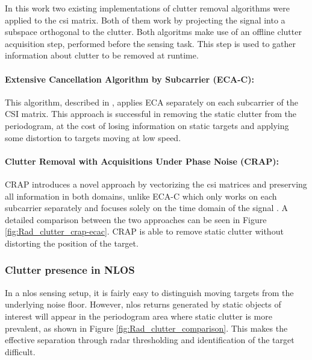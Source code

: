 	In this work two existing implementations of clutter removal algorithms were applied to the \gls{csi} matrix.
	Both of them work by projecting the signal into a subspace orthogonal to the clutter.
	Both algoritms make use of an offline clutter acquisition step, performed before the sensing task. This step is used to gather information about clutter to be removed at runtime.
	
	\paragraph{Extensive Cancellation Algorithm by Subcarrier (ECA-C):}
	This algorithm, described in \cite{Wan_Cheng_Gong_Zhao_Shao_2012}, applies ECA \cite{Colone_ECA_2009} separately on each subcarrier of the CSI matrix.
	This approach is successful in removing the static clutter from the periodogram, at the cost of losing information on static targets and applying some distortion to targets moving at low speed.
	\paragraph{Clutter Removal with Acquisitions Under Phase Noise (CRAP):}
	CRAP introduces a novel approach by vectorizing the \gls{csi} matrices and preserving all information in both domains, unlike ECA-C which only works on each subcarrier separately and focuses solely on the time domain of the signal \cite{Henninger_CRAP_2023}.
	A detailed comparison between the two approaches can be seen in Figure \ref{fig:Rad_clutter_crap-ecac}. CRAP is able to remove static clutter without distorting the position of the target.
	
	
	\subsubsection{Clutter presence in NLOS}
	
	In a \gls{nlos} sensing setup, it is fairly easy to distinguish moving targets from the underlying noise floor.
	However, \gls{nlos} returns generated by static objects of interest will appear in the periodogram area where static clutter is more prevalent, as shown in Figure \ref{fig:Rad_clutter_comparison}.
	This makes the effective separation through radar thresholding and identification of the target difficult.

